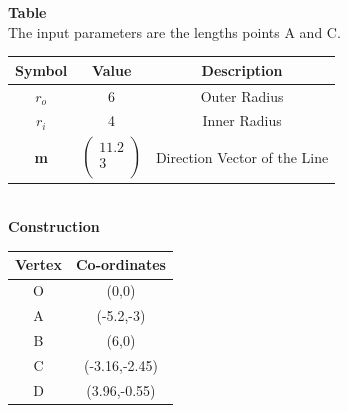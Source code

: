 \documentclass[10pt,a4paper]{report}
\begin{document}
\begin{multicols}{2}
\textbf{Table} \vspace{2mm} \\

The input parameters are the lengths points A and C. \vspace{2mm} \\
{
\setlength\extrarowheight{2pt}
\begin{tabular}{|c|c|c|}
	\hline
	\textbf{Symbol}&\textbf{Value}&\textbf{Description}\\
	\hline
	$r_o$ & 6 &Outer Radius\\
	\hline
	$r_i$ & 4 & Inner Radius\\
	\hline
	\textbf{m} &$
	\begin{pmatrix}
		11.2\\
		3\\
	\end{pmatrix}$
	& Direction Vector of the Line\\
	\hline
\end{tabular}
}\vspace{6mm} \\
\textbf{Construction} \vspace{3mm} \\
{
\setlength\extrarowheight{2pt}
\begin{tabular}{|c|c|}
	\hline
	\textbf{Vertex}&\textbf{Co-ordinates}\\
	\hline
	O & (0,0)\\
	\hline
	A & (-5.2,-3)\\
	\hline
	B & (6,0)\\
	\hline
	C & (-3.16,-2.45)\\
	\hline
	D & (3.96,-0.55)\\
	\hline
\end{tabular}
}

  \end{multicols}
\end{document}
